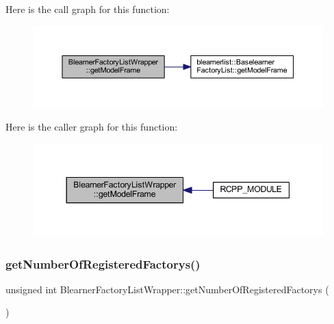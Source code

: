 Here is the call graph for this function\+:\nopagebreak
\begin{figure}[H]
\begin{center}
\leavevmode
\includegraphics[width=350pt]{class_blearner_factory_list_wrapper_ae6cfdabc3dfe85a90a1c6eb5620edeb9_cgraph}
\end{center}
\end{figure}
Here is the caller graph for this function\+:\nopagebreak
\begin{figure}[H]
\begin{center}
\leavevmode
\includegraphics[width=344pt]{class_blearner_factory_list_wrapper_ae6cfdabc3dfe85a90a1c6eb5620edeb9_icgraph}
\end{center}
\end{figure}
\mbox{\label{class_blearner_factory_list_wrapper_ad497952e0c045016b70b94d06a713b44}} 
\subsubsection{\texorpdfstring{get\+Number\+Of\+Registered\+Factorys()}{getNumberOfRegisteredFactorys()}}
{\footnotesize\ttfamily unsigned int Blearner\+Factory\+List\+Wrapper\+::get\+Number\+Of\+Registered\+Factorys (\begin{DoxyParamCaption}{ }\end{DoxyParamCaption})\hspace{0.3cm}{\ttfamily [inline]}}

